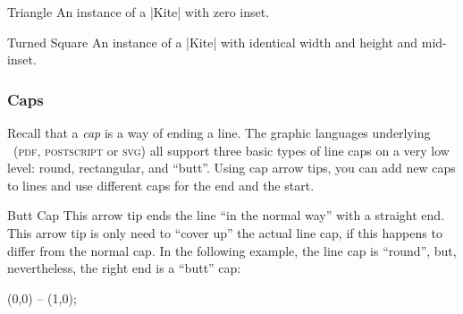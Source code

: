 \begin{arrowtipsimple}{Triangle}
    An instance of a |Kite| with zero inset.
    \begin{arrowexamples}
        \arrowexample[]
        \arrowexampledup[sep]
        \arrowexampledupdot[sep]
        \arrowexample[open]
        \arrowexample[length=4pt]
        \arrowexample[angle=45:1pt 3]
        \arrowexample[angle=60:1pt 3]
        \arrowexample[angle=90:1pt 3]
        \arrowexample[round]
        \arrowexample[slant=.3]
        \arrowexample[left]
        \arrowexample[right]
        \arrowexample[red]
    \end{arrowexamples}
\end{arrowtipsimple}

\begin{arrowtipsimple}{Turned Square}
    An instance of a |Kite| with identical width and height and mid-inset.
    \begin{arrowexamples}
        \arrowexample[]
        \arrowexampledup[sep]
        \arrowexampledupdot[sep]
        \arrowexample[open]
        \arrowexample[length=4pt]
        \arrowexample[round]
        \arrowexample[slant=.3]
        \arrowexample[left]
        \arrowexample[right]
        \arrowexample[red]
    \end{arrowexamples}
\end{arrowtipsimple}


\subsubsection{Caps}

Recall that a \emph{cap} is a way of ending a line. The graphic languages
underlying \tikzname\ (\textsc{pdf}, \textsc{postscript} or \textsc{svg}) all
support three basic types of line caps on a very low level: round, rectangular,
and ``butt''. Using cap arrow tips, you can add new caps to lines and use
different caps for the end and the start.

\begin{arrowtipsimple}{Butt Cap}
    This arrow tip ends the line ``in the normal way'' with a straight end.
    This arrow tip is only need to ``cover up'' the actual line cap, if this
    happens to differ from the normal cap. In the following example, the line
    cap is ``round'', but, nevertheless, the right end is a ``butt'' cap:
\begin{codeexample}[]
\tikz \draw [line width=1ex, line cap=round, -Butt Cap] (0,0) -- (1,0);
\end{codeexample}
\end{arrowtipsimple}

